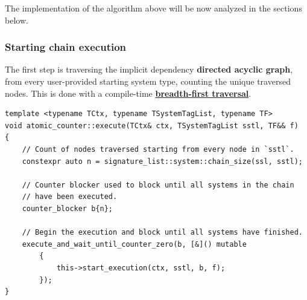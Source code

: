\documentclass[twoside, 12pt, a4paper, openany]{book}
\begin{document}
\begin{algorithm}[H]
{        
        \F{\SystemOf{\T}}\;
        \DecrementAtomicCounter{\RemainingSystems}\;
        \BlankLine


    }
    \KwEnd

\end{algorithm}

The implementation of the algorithm above will be now analyzed in the
sections below.

\hypertarget{mt_s_sce}{\subsubsection{Starting chain
execution}\label{mt_s_sce}}

The first step is traversing the implicit dependency \textbf{directed
acyclic graph}, from every user-provided starting system type, counting
the unique traversed nodes. This is done with a compile-time
\protect\hyperlink{appendix_compiletime_bfs}{\textbf{breadth-first
traversal}}.

\begin{verbatim}
template <typename TCtx, typename TSystemTagList, typename TF>
void atomic_counter::execute(TCtx& ctx, TSystemTagList sstl, TF&& f)
{
    // Count of nodes traversed starting from every node in `sstl`.
    constexpr auto n = signature_list::system::chain_size(ssl, sstl);

    // Counter blocker used to block until all systems in the chain
    // have been executed.
    counter_blocker b{n};

    // Begin the execution and block until all systems have finished.
    execute_and_wait_until_counter_zero(b, [&]() mutable
        {
            this->start_execution(ctx, sstl, b, f);
        });
}
\end{verbatim}
\end{document}
